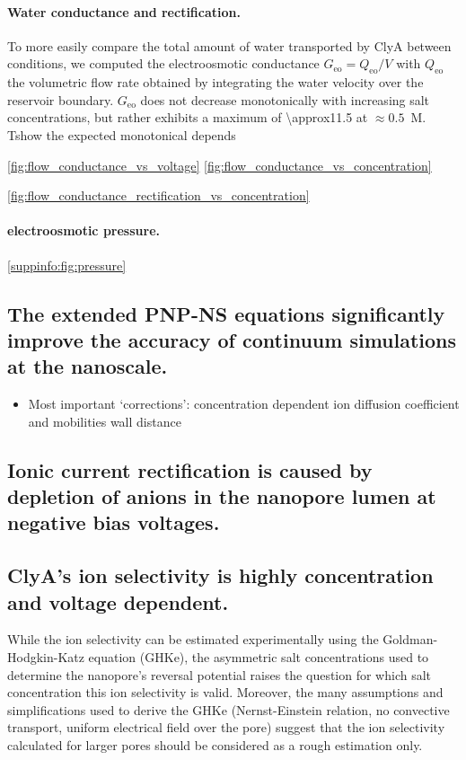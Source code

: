 \documentclass[journal=ancac3,manuscript=article,etalmode=truncate,maxauthors=0,layout=onecolumn]{achemso}
\begin{document}
\paragraph{Water conductance and rectification.}
%
To more easily compare the total amount of water transported by ClyA between
conditions, we computed the electroosmotic conductance $G_{\text{eo}} =
Q_{\text{eo}}/V$ with $Q_{\text{eo}}$ the volumetric flow rate obtained by
integrating the water velocity over the reservoir boundary.  $G_{\text{eo}}$ does not decrease monotonically with increasing salt
concentrations, but rather exhibits a maximum of \SI{\approx11.5}{\cnmpnspv} at
$\approx0.5$~M. Tshow the expected monotonical depends

\cite{Mao-2014,Laohakunakorn-2015}



\cref{fig:flow_conductance_vs_voltage}
\cref{fig:flow_conductance_vs_concentration}


\cref{fig:flow_conductance_rectification_vs_concentration}

\paragraph{electroosmotic pressure.}
\cref{suppinfo:fig:pressure}
\cite{Hoogerheide-2014}


\subsection{The extended PNP-NS equations significantly improve the accuracy of continuum simulations at the
nanoscale.}

\begin{itemize}
  \item Most important `corrections':
  \subitem concentration dependent ion diffusion coefficient and mobilities
  \subitem wall distance
\end{itemize}

\subsection{Ionic current rectification is caused by depletion of anions in the nanopore lumen at negative
bias voltages.}

\subsection{ClyA's ion selectivity is highly concentration and voltage dependent.}
While the ion selectivity can be estimated experimentally using the
Goldman-Hodgkin-Katz equation (GHKe),\cite{Franceschini-2016,Huang-2017} the
asymmetric salt concentrations used to determine the nanopore's reversal
potential raises the question for which salt concentration this ion selectivity
is valid. Moreover, the many assumptions and simplifications used to derive the
GHKe (Nernst-Einstein relation, no convective transport, uniform electrical
field over the pore) suggest that the ion selectivity calculated for larger
pores should be considered as a rough estimation only.
\end{document}
